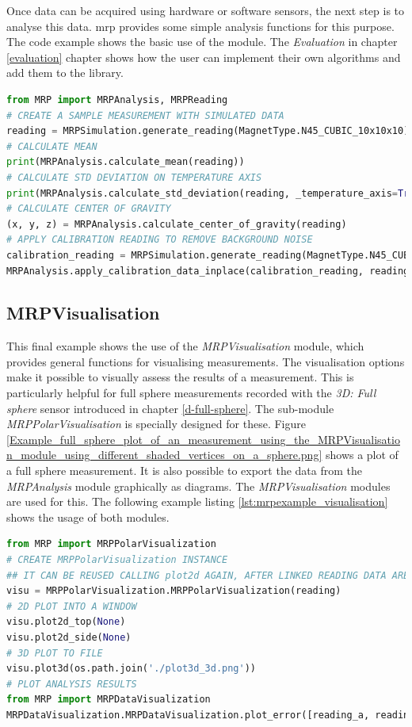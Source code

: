 Once data can be acquired using hardware or software sensors, the next
step is to analyse this data. \gls{mrp} provides some simple analysis
functions for this purpose. The code example shows the basic use of the
module. The \emph{Evaluation} in chapter \ref{evaluation} chapter shows
how the user can implement their own algorithms and add them to the
library.

\begin{lstlisting}[language=Python, caption={MRPAnalysis example code performs several data analysis steps}, label=lst:mrpexample_analysis]
from MRP import MRPAnalysis, MRPReading
# CREATE A SAMPLE MEASUREMENT WITH SIMULATED DATA
reading = MRPSimulation.generate_reading(MagnetType.N45_CUBIC_10x10x10)
# CALCULATE MEAN
print(MRPAnalysis.calculate_mean(reading))
# CALCULATE STD DEVIATION ON TEMPERATURE AXIS
print(MRPAnalysis.calculate_std_deviation(reading, _temperature_axis=True))
# CALCULATE CENTER OF GRAVITY
(x, y, z) = MRPAnalysis.calculate_center_of_gravity(reading)
# APPLY CALIBRATION READING TO REMOVE BACKGROUND NOISE
calibration_reading = MRPSimulation.generate_reading(MagnetType.N45_CUBIC_10x10x10, _ideal = True)
MRPAnalysis.apply_calibration_data_inplace(calibration_reading, reading)
\end{lstlisting}

\hypertarget{mrpvisualisation}{%
\subsection{MRPVisualisation}\label{mrpvisualisation}}

This final example shows the use of the \emph{MRPVisualisation} module,
which provides general functions for visualising measurements. The
visualisation options make it possible to visually assess the results of
a measurement. This is particularly helpful for full sphere measurements
recorded with the \emph{3D: Full sphere} sensor introduced in chapter
\ref{d-full-sphere}. The sub-module \emph{MRPPolarVisualisation} is
specially designed for these. Figure
\ref{Example_full_sphere_plot_of_an_measurement_using_the_MRPVisualisation_module_using_different_shaded_vertices_on_a_sphere.png}
shows a plot of a full sphere measurement. It is also possible to export
the data from the \emph{MRPAnalysis} module graphically as diagrams. The
\emph{MRPVisualisation} modules are used for this. The following example
listing \ref{lst:mrpexample_visualisation} shows the usage of both
modules.

\begin{lstlisting}[language=Python, caption={MRPVisualisation example which plots a full sphere to an image file}, label=lst:mrpexample_visualisation]
from MRP import MRPPolarVisualization
# CREATE MRPPolarVisualization INSTANCE
## IT CAN BE REUSED CALLING plot2d AGAIN, AFTER LINKED READING DATA ARE MODIFIED
visu = MRPPolarVisualization.MRPPolarVisualization(reading)
# 2D PLOT INTO A WINDOW
visu.plot2d_top(None)
visu.plot2d_side(None)
# 3D PLOT TO FILE
visu.plot3d(os.path.join('./plot3d_3d.png'))
# PLOT ANALYSIS RESULTS
from MRP import MRPDataVisualization
MRPDataVisualization.MRPDataVisualization.plot_error([reading_a, reading_b, reading_c])
\end{lstlisting}

